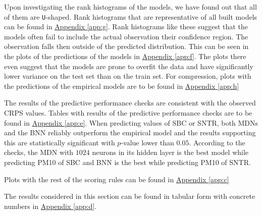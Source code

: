 \documentclass[12pt,a4paper,twoside]{scrartcl}
\numberwithin{equation}{section}
\newcommand{\refapp}[1]{\hyperref[#1]{Appendix \ref*{#1}}}
\begin{document}
Upon investigating the rank histograms of the models, we have found out that all of them are \texttt{U}-shaped. Rank histograms that are representative of all built models can be found in \refapp{app:g}. Rank histograms like these suggest that the models often fail to include the actual observation their confidence region. The observation falls then outside of the predicted distribution. This can be seen in the plots of the predictions of the models in \refapp{app:f}. The plots there even suggest that the models are prone to overfit the data and have significantly lower variance on the test set than on the train set. For compression, plots with the predictions of the empirical models are to be found in \refapp{app:h}

The results of the predictive performance checks are consistent with the observed CRPS values. Tables with results of the predictive performance checks are to be found in \refapp{app:e}. When predicting values of SBC or SNTR, both MDNs and the BNN reliably outperform the empirical model and the results supporting this are statistically significant with \(p\)-value lower than \(0.05\). According to the checks, the MDN with \(1024\) neurons in its hidden layer is the best model while predicting PM10 of SBC and BNN is the best while predicting PM10 of SNTR.

Plots with the rest of the scoring rules can be found in \refapp{app:c}

The results considered in this section can be found in tabular form with concrete numbers in \refapp{app:d}.
\end{document}

